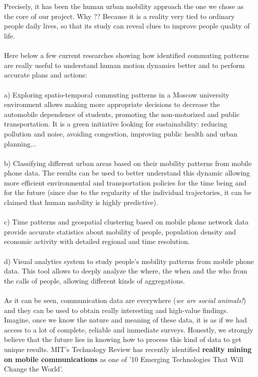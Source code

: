 \\
\\
Precisely, it has been the human urban mobility approach the one we chose as the core of our project. Why ?? Because it is a reality very tied to ordinary people daily lives, so that its study can reveal clues to improve people quality of life.
\\
\\
Here below a few current researches showing how identified commuting patterns are really useful to understand human motion dynamics better and to perform accurate plans and actions:
\\
\\
a) Exploring spatio-temporal commuting patterns in a Moscow university environment allows making more appropriate decisions to decrease the automobile dependence of students, promoting the non-motorized and public transportation. It is a green initiative looking for sustainability: reducing pollution and noise, avoiding congestion, improving public health and urban planning...
\\
\\
b) Classifying different urban areas based on their mobility patterns from mobile phone data. The results can be used to better understand this dynamic allowing more efficient environmental and transportation policies for the time being and for the future (since due to the regularity of the individual trajectories, it can be claimed that human mobility is highly predictive).
\\
\\
c) Time patterns and geospatial clustering based on mobile phone network data provide accurate statistics about mobility of people, population density and economic activity with detailed regional and time resolution.
\\
\\
d) Visual analytics system to study people's mobility patterns from mobile phone data. This tool allows to deeply analyze the where, the when and the who from the calls of  people, allowing different kinds of aggregations.
\\
\\
As it can be seen, communication data are everywhere ({\it we are social animals!}) and they can be used to obtain really interesting and high-value findings. Imagine, once we know the nature and meaning of these data, it is as if we had access to a lot of complete, reliable and immediate surveys. Honestly, we strongly believe that the future lies in knowing how to process this kind of data to get unique results. MIT's Technology Review has recently identified {\bf reality mining on mobile communications} as one of '10 Emerging Technologies That Will Change the World'.
